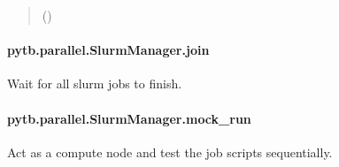 \documentclass[letterpaper,10pt,english,openany,oneside]{sphinxmanual}
\begin{document}
\begin{fulllineitems}
\begin{fulllineitems}
\begin{quote}
\begin{description}
\begin{description}
\end{description}


\sphinxAtStartPar
()

\end{description}\end{quote}

\end{fulllineitems}


\sphinxstepscope


\paragraph{pytb.parallel.SlurmManager.join}
\label{\detokenize{api/pytb.parallel.SlurmManager.join:pytb-parallel-slurmmanager-join}}\label{\detokenize{api/pytb.parallel.SlurmManager.join::doc}}

\begin{fulllineitems}
\label{\detokenize{api/pytb.parallel.SlurmManager.join:pytb.parallel.SlurmManager.join}}
\pysigstartsignatures
{}
\pysigstopsignatures
\sphinxAtStartPar
Wait for all slurm jobs to finish.

\end{fulllineitems}


\sphinxstepscope


\paragraph{pytb.parallel.SlurmManager.mock\_run}
\label{\detokenize{api/pytb.parallel.SlurmManager.mock_run:pytb-parallel-slurmmanager-mock-run}}\label{\detokenize{api/pytb.parallel.SlurmManager.mock_run::doc}}

\begin{fulllineitems}
\label{\detokenize{api/pytb.parallel.SlurmManager.mock_run:pytb.parallel.SlurmManager.mock_run}}
\pysigstartsignatures
{}
\pysigstopsignatures
\sphinxAtStartPar
Act as a compute node and test the job scripts sequentially.


\end{fulllineitems}
\end{fulllineitems}
\end{document}
